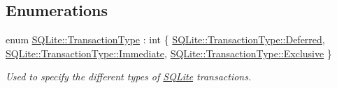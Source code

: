 \subsection*{Enumerations}
\begin{DoxyCompactItemize}
\item 
enum \hyperlink{a00038_af94f2dd6dcae8699eada7a0382e48e66}{S\-Q\-Lite\-::\-Transaction\-Type} \-: int \{ \hyperlink{a00038_af94f2dd6dcae8699eada7a0382e48e66a4ed71db54748b36eeb398876b0c747ac}{S\-Q\-Lite\-::\-Transaction\-Type\-::\-Deferred}, 
\hyperlink{a00038_af94f2dd6dcae8699eada7a0382e48e66a43f6615bbb2c40a5306ff804094420b1}{S\-Q\-Lite\-::\-Transaction\-Type\-::\-Immediate}, 
\hyperlink{a00038_af94f2dd6dcae8699eada7a0382e48e66a2ef50b4c466304dc6ac77bac8a779971}{S\-Q\-Lite\-::\-Transaction\-Type\-::\-Exclusive}
 \}
\begin{DoxyCompactList}\small\item\em Used to specify the different types of \hyperlink{a00038}{S\-Q\-Lite} transactions. \end{DoxyCompactList}\end{DoxyCompactItemize}
